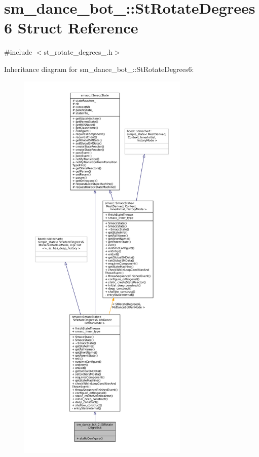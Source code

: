 \hypertarget{structsm__dance__bot__2_1_1StRotateDegrees6}{}\section{sm\+\_\+dance\+\_\+bot\+\_\+:\+:St\+Rotate\+Degrees6 Struct Reference}
\label{structsm__dance__bot__2_1_1StRotateDegrees6}


{\ttfamily \#include $<$st\+\_\+rotate\+\_\+degrees\+\_.\+h$>$}



Inheritance diagram for sm\+\_\+dance\+\_\+bot\+\_\+:\+:St\+Rotate\+Degrees6\+:
\nopagebreak
\begin{figure}[H]
\begin{center}
\leavevmode
\includegraphics[height=550pt]{structsm__dance__bot__2_1_1StRotateDegrees6__inherit__graph}
\end{center}
\end{figure}


